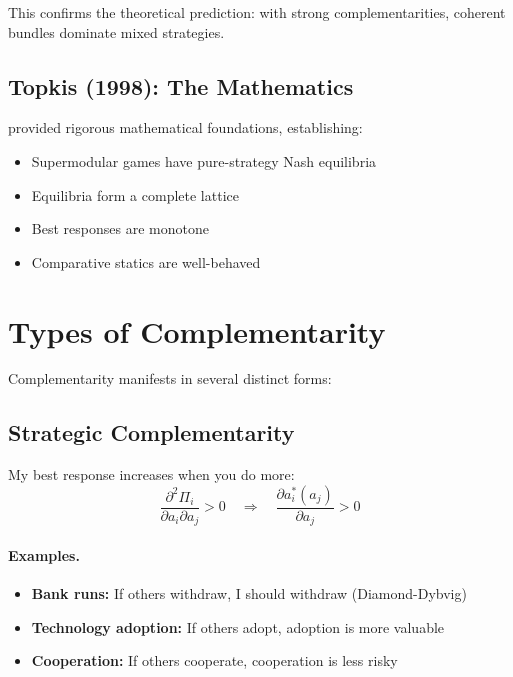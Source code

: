 This confirms the theoretical prediction: with strong complementarities,
coherent bundles dominate mixed strategies.

\subsection{Topkis (1998): The Mathematics}

\citet{topkis1998} provided rigorous mathematical foundations, establishing:
\begin{itemize}[nosep]
  \item Supermodular games have pure-strategy Nash equilibria
  \item Equilibria form a complete lattice
  \item Best responses are monotone
  \item Comparative statics are well-behaved
\end{itemize}



\section{Types of Complementarity}
\label{sec:comp-types}


Complementarity manifests in several distinct forms:

\subsection{Strategic Complementarity}

\begin{definition}
My best response increases when you do more:
\begin{equation}
  \frac{\partial^2 \Pi_i}{\partial a_i \partial a_j} > 0
  \quad \Rightarrow \quad
  \frac{\partial a_i^*(a_j)}{\partial a_j} > 0
\end{equation}
\end{definition}

\paragraph{Examples.}
\begin{itemize}[nosep]
  \item \textbf{Bank runs:} If others withdraw, I should withdraw (Diamond-Dybvig)
  \item \textbf{Technology adoption:} If others adopt, adoption is more valuable
  \item \textbf{Cooperation:} If others cooperate, cooperation is less risky
\end{itemize}

